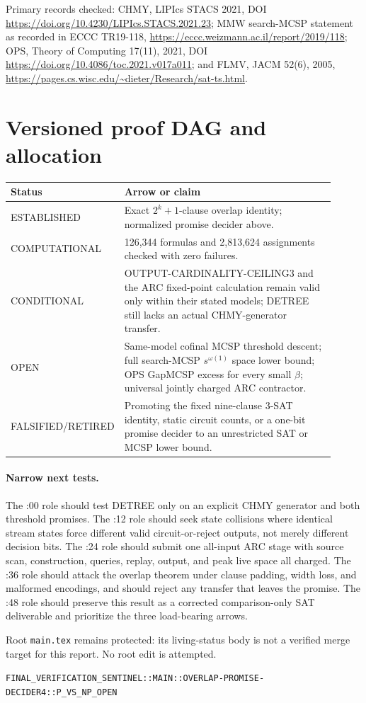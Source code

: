 \documentclass[11pt]{article}
\begin{document}
Primary records checked: CHMY, LIPIcs STACS 2021, DOI
\url{https://doi.org/10.4230/LIPIcs.STACS.2021.23}; MMW search-MCSP statement as
recorded in ECCC TR19-118, \url{https://eccc.weizmann.ac.il/report/2019/118};
OPS, Theory of Computing 17(11), 2021, DOI
\url{https://doi.org/10.4086/toc.2021.v017a011}; and FLMV, JACM 52(6), 2005,
\url{https://pages.cs.wisc.edu/~dieter/Research/sat-ts.html}.

\section{Versioned proof DAG and allocation}
\begin{center}
\begin{tabular}{p{0.18\linewidth}p{0.73\linewidth}}
\toprule
Status & Arrow or claim \\
\midrule
ESTABLISHED & Exact $2^k+1$-clause overlap identity; normalized promise decider above. \\
COMPUTATIONAL & 126,344 formulas and 2,813,624 assignments checked with zero failures. \\
CONDITIONAL & OUTPUT-CARDINALITY-CEILING3 and the ARC fixed-point calculation remain valid only within their stated models; DETREE still lacks an actual CHMY-generator transfer. \\
OPEN & Same-model cofinal MCSP threshold descent; full search-MCSP $s^{\omega(1)}$ space lower bound; OPS GapMCSP excess for every small $\beta$; universal jointly charged ARC contractor. \\
FALSIFIED/RETIRED & Promoting the fixed nine-clause 3-SAT identity, static circuit counts, or a one-bit promise decider to an unrestricted SAT or MCSP lower bound. \\
\bottomrule
\end{tabular}
\end{center}

\paragraph{Narrow next tests.}
The :00 role should test DETREE only on an explicit CHMY generator and both
threshold promises.  The :12 role should seek state collisions where identical
stream states force different valid circuit-or-reject outputs, not merely
different decision bits.  The :24 role should submit one all-input ARC stage
with source scan, construction, queries, replay, output, and peak live space all
charged.  The :36 role should attack the overlap theorem under clause padding,
width loss, and malformed encodings, and should reject any transfer that leaves
the promise.  The :48 role should preserve this result as a corrected
comparison-only SAT deliverable and prioritize the three load-bearing arrows.

Root \texttt{main.tex} remains protected: its living-status body is not a
verified merge target for this report.  No root edit is attempted.

\vfill
\noindent\texttt{FINAL\_VERIFICATION\_SENTINEL::MAIN::OVERLAP-PROMISE-DECIDER4::P\_VS\_NP\_OPEN}
\end{document}
